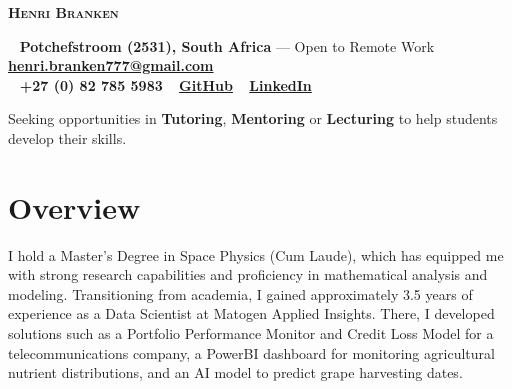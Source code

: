 \documentclass[a4paper,10pt]{article}
\begin{document}
\begin{center}
	{\Huge\textbf{\textsc{\textcolor{burnt}{Henri Branken}}}}\\[0.5cm]
\end{center}

\begin{tcolorbox}[
	colback=teal!10, %
	colframe=teal,   %
	boxrule=1pt, %
	width=\textwidth,
	left=10pt, right=10pt, %
	sharp corners=northwest
	]
	\begin{center}
		\faHome~ \textbf{Potchefstroom (2531), South Africa} --- Open to Remote Work \quad \faEnvelope~ \href{mailto:henri.branken777@gmail.com}{\textbf{henri.branken777@gmail.com}} \quad\\ \faPhone~ \textbf{+27 (0) 82 785 5983} \quad \faGithub~ \href{https://github.com/HenriBranken}{\textbf{GitHub}} \quad
		\faLinkedin~ \href{https://www.linkedin.com/in/henri-branken-1423a2153/}{\textbf{LinkedIn}}
	\end{center}
\end{tcolorbox}


\begin{tcolorbox}[
	colback=burntshade,    %
	colframe=burnt,     %
	boxrule=1pt,        %
	sharp corners=northwest,
	rounded corners=southwest,
	coltitle=white,     %
	fonttitle=\large\bfseries\scshape,  %
	title=Career Objective,
	width=\textwidth,   %
	left=10pt, right=10pt, top=5pt, bottom=5pt  %
	]
	Seeking opportunities in \textbf{Tutoring}, \textbf{Mentoring} or \textbf{Lecturing} to help students develop their skills.
\end{tcolorbox}

\section*{Overview}
I hold a Master's Degree in Space Physics (Cum Laude), which has equipped me with strong research capabilities and proficiency in mathematical analysis and modeling. Transitioning from academia, I gained approximately 3.5 years of experience as a Data Scientist at Matogen Applied Insights. There, I developed solutions such as a Portfolio Performance Monitor and Credit Loss Model for a telecommunications company, a PowerBI dashboard for monitoring agricultural nutrient distributions, and an AI model to predict grape harvesting dates.
\end{document}
